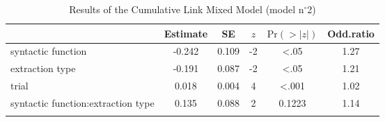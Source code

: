 \begin{table}
\begin{tabularx}{\textwidth}{Q S[table-format=-1.3] S[table-format=1.3] S[table-format=-1] S[table-format=<1.4] S[table-format=1.2]}
  \lsptoprule
 & {Estimate} & {SE} & {$z$} & {$\text{Pr}(>|z|)$} & {Odd.ratio} \\ 
  \midrule
  syntactic function & -0.242 & 0.109 & -2 & <.05 & 1.27 \\ 
  extraction type & -0.191 & 0.087 & -2 & <.05 & 1.21 \\ 
  trial & 0.018 & 0.004 & 4 & <.001 & 1.02 \\ 
  syntactic function:extraction type & 0.135 & 0.088 & 2 & 0.1223 & 1.14 \\ 
   \lspbottomrule
\end{tabularx}
\caption{Results of the Cumulative Link Mixed Model (model n$^{\circ}$2)}
\label{tab:exp04-m2}
\end{table}
